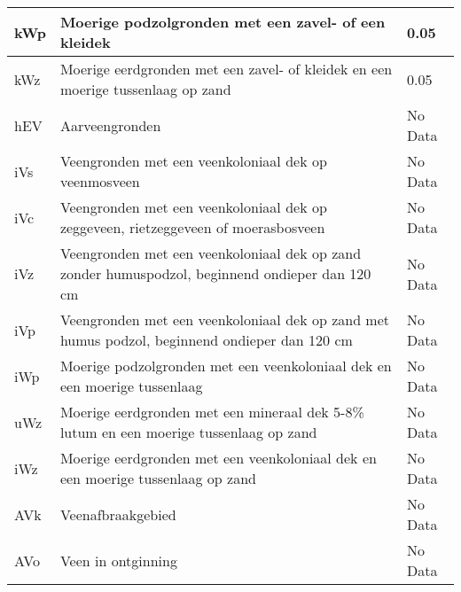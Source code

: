 \documentclass[12pt,a4paper,titlepage]{article}
\begin{document}
\begin{appendices}
\begin{center}
\begin{longtable}{|l| p{11cm} | l |}
kWp & Moerige podzolgronden met een zavel- of een kleidek  & 0.05 \\ \hline
kWz & Moerige eerdgronden met een zavel- of kleidek en een moerige tussenlaag op zand  & 0.05 \\ \hline
hEV & Aarveengronden  & \multicolumn{1}{l|}{No Data} \\ \hline
iVs & Veengronden met een veenkoloniaal dek op veenmosveen & \multicolumn{1}{l|}{No Data} \\ \hline
iVc & Veengronden met een veenkoloniaal dek op zeggeveen, rietzeggeveen of moerasbosveen  & \multicolumn{1}{l|}{No Data} \\ \hline
iVz & Veengronden met een veenkoloniaal dek op zand zonder humuspodzol, beginnend ondieper dan 120 cm  & \multicolumn{1}{l|}{No Data} \\ \hline
iVp & Veengronden met een veenkoloniaal dek op zand met humus podzol, beginnend ondieper dan 120 cm  & \multicolumn{1}{l|}{No Data} \\ \hline
iWp & Moerige podzolgronden met een veenkoloniaal dek en een moerige tussenlaag  & \multicolumn{1}{l|}{No Data} \\ \hline
uWz & Moerige eerdgronden met een mineraal dek 5-8\% lutum en een moerige tussenlaag op zand  & \multicolumn{1}{l|}{No Data} \\ \hline
iWz & Moerige eerdgronden met een veenkoloniaal dek en een moerige tussenlaag op zand  & \multicolumn{1}{l|}{No Data} \\ \hline
AVk & Veenafbraakgebied & \multicolumn{1}{l|}{No Data} \\ \hline
AVo & Veen in ontginning & \multicolumn{1}{l|}{No Data} \\ \hline
\end{longtable}
\end{center}


\end{appendices}


\end{document}
